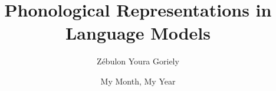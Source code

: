 
\title{Phonological Representations in Language Models}

\author{Z\'ebulon Youra Goriely}



\submissiondate{\today}


\date{My Month, My Year}

